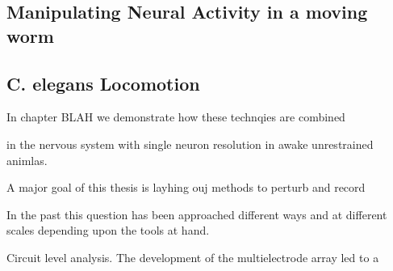 \subsection{Manipulating Neural Activity in a moving worm}

\subsection{C. elegans Locomotion}
In chapter BLAH we demonstrate how these technqies are combined 


in the nervous system with single neuron resolution in awake unrestrained animlas. 

A major goal of this thesis is layhing ouj methods to perturb and record 












 In the past this question has been approached different ways and at different scales depending upon the tools at hand. 


Circuit level analysis.
The development of the multielectrode array \citep{meister_synchronous_1991} \citep{litke_retinal_1991}  led to a 






